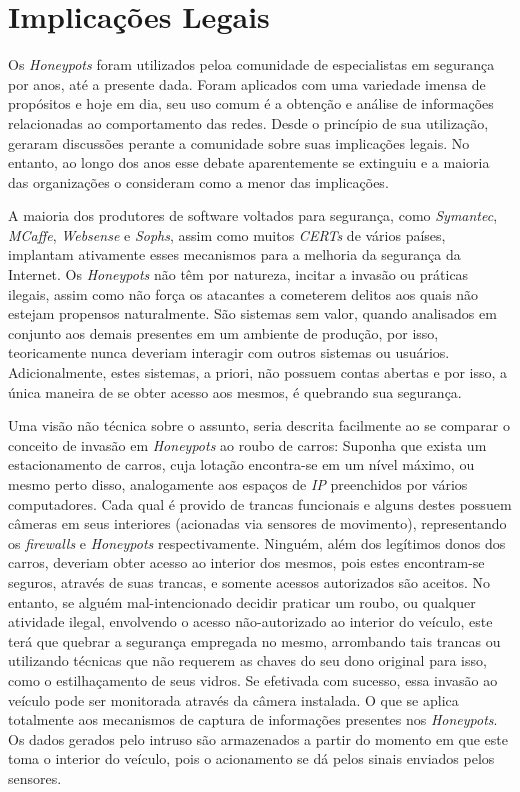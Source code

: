\section{Implicações Legais}


Os \textit{Honeypots} foram utilizados peloa comunidade de especialistas em segurança por anos, até a presente dada. Foram aplicados com uma variedade imensa de propósitos e hoje em dia, seu uso comum é a obtenção e análise de informações relacionadas ao comportamento das redes. Desde o princípio de sua utilização, geraram discussões perante a comunidade sobre suas implicações legais. No entanto, ao longo dos anos esse debate aparentemente se extinguiu e a maioria das organizações o consideram como a menor das implicações. \cite{AreHoneypotsIllegal}

A maioria dos produtores de software voltados para segurança, como \textit{Symantec}, \textit{MCaffe}, \textit{Websense} e \textit{Sophs}, assim como muitos \textit{CERTs} de vários países, implantam ativamente esses mecanismos para a melhoria da segurança da Internet. Os \textit{Honeypots} não têm por natureza, incitar a invasão ou práticas ilegais, assim como não força os atacantes a cometerem delitos aos quais não estejam propensos naturalmente. São sistemas sem valor, quando analisados em conjunto aos demais presentes em um ambiente de produção, por isso, teoricamente nunca deveriam interagir com outros sistemas ou usuários. Adicionalmente, estes sistemas, a priori, não possuem contas abertas e por isso, a única maneira de se obter acesso aos mesmos, é quebrando sua segurança.

Uma visão não técnica sobre o assunto, seria descrita facilmente ao se comparar o conceito de invasão em \textit{Honeypots} ao roubo de carros: Suponha que exista um estacionamento de carros, cuja lotação encontra-se em um nível máximo, ou mesmo perto disso, analogamente aos espaços de \textit{IP} preenchidos por vários computadores. Cada qual é provido de trancas funcionais e alguns destes possuem câmeras em seus interiores (acionadas via sensores de movimento), representando os \textit{firewalls} e \textit{Honeypots} respectivamente. Ninguém, além dos legítimos donos dos carros, deveriam obter acesso ao interior dos mesmos, pois estes encontram-se seguros, através de suas trancas, e somente acessos autorizados são aceitos. No entanto, se alguém mal-intencionado decidir praticar um roubo, ou qualquer atividade ilegal, envolvendo o acesso não-autorizado ao interior do veículo, este terá que quebrar a segurança empregada no mesmo, arrombando tais trancas ou utilizando técnicas que não requerem as chaves do seu dono original para isso, como o estilhaçamento de seus vidros. Se efetivada com sucesso, essa invasão ao veículo pode ser monitorada através da câmera instalada. O que se aplica totalmente aos mecanismos de captura de informações presentes nos \textit{Honeypots}. Os dados gerados pelo intruso são armazenados a partir do momento em que este toma o interior do veículo, pois o acionamento se dá pelos sinais enviados pelos sensores.

